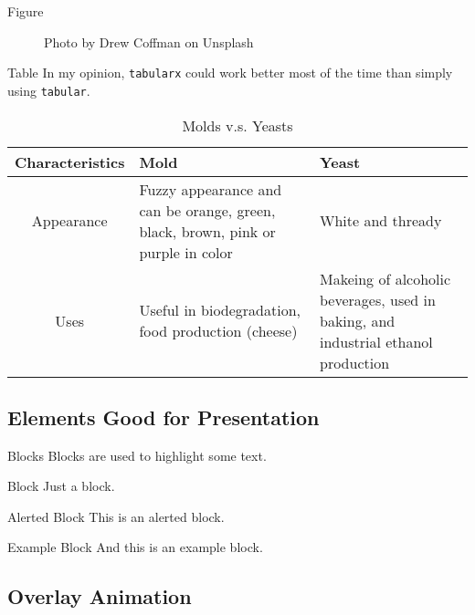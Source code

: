 \documentclass[10pt]{beamer}
\begin{document}
\begin{frame}{Figure}
  \begin{figure}
    \centering
    \caption{Photo by Drew Coffman on Unsplash}
    \label{fig:breads-by-drew-coffman}
  \end{figure}
\end{frame}

\begin{frame}{Table}
  In my opinion, \texttt{tabularx} could work better most of the time than simply using \texttt{tabular}.
  \begin{table}
    \centering
    \begin{tabularx}{\textwidth}{|c|X|X|}
      \hline
      \textbf{Characteristics} & \textbf{Mold} & \textbf{Yeast} \\ \hline\hline
      Appearance
      & Fuzzy appearance and can be orange, green, black, brown, pink or purple in color
      & White and thready \\ \hline
      Uses
      & Useful in biodegradation, food production (cheese)
      & Makeing of alcoholic beverages, used in baking, and industrial ethanol production \\ \hline
    \end{tabularx}
    \caption{Molds v.s. Yeasts}
    \label{tab:molds-vs-yeasts}
  \end{table}
\end{frame}

\subsection{Elements Good for Presentation}

\begin{frame}{Blocks}
  Blocks are used to highlight some text.
  \begin{block}{Block}
    Just a block.
  \end{block}
  \begin{alertblock}{Alerted Block}
    This is an alerted block.
  \end{alertblock}
  \begin{exampleblock}{Example Block}
    And this is an example block.
  \end{exampleblock}
\end{frame}

\subsection{Overlay Animation}
\end{document}

